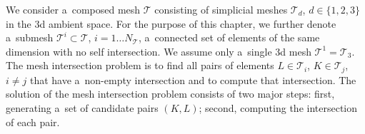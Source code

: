 
We consider a~composed mesh $\mathcal T$ consisting of simplicial meshes $\mathcal T_d$, $d\in \{1,2,3\}$ in the 3d ambient space.
For the purpose of this chapter, we further denote a~submesh $\mathcal T^i \subset \mathcal T$, $i=1\ldots N_\mathcal{T}$,
a~connected set of elements of the same dimension with no self intersection. We assume only a~single 3d mesh $\mathcal T^1=\mathcal T_3$.
The mesh intersection problem is to find all pairs of elements $L\in \mathcal{T}_i$, $K\in \mathcal{T}_j$, $i\ne j$ that have a~non-empty intersection 
and to compute that intersection.
The solution of the mesh intersection problem consists of two major steps: first, generating a~set of candidate pairs $(K, L)$;
second, computing the intersection of each pair.

